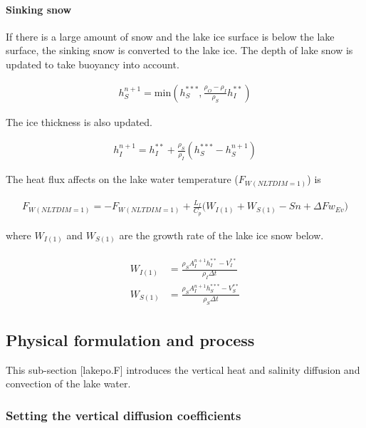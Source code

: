 \hypertarget{sinking-snow}{%
\paragraph{Sinking snow}\label{sinking-snow}}

If there is a large amount of snow and the lake ice surface is below the lake surface, the sinking snow is converted to the lake ice. The depth of lake snow is updated to take buoyancy into account.

\begin{eqnarray}
    h_S^{n+1} = \mathrm{min}(h_S^{\ast\ast\ast}, \frac{\rho_O-\rho_I}{\rho_S}h_I^{\ast\ast})
\end{eqnarray}

The ice thickness is also updated.

\begin{eqnarray}
    h_I^{n+1} = h_I^{\ast\ast} + \frac{\rho_S}{\rho_I} (h_S^{\ast\ast\ast}-h_S^{n+1})
\end{eqnarray}

The heat flux affects on the lake water temperature (\(F_{W(NLTDIM=1)}\)) is

\begin{eqnarray}
    F_{W(NLTDIM=1)} = - F_{W(NLTDIM=1)} + \frac{L_f}{C_p} \Big(W_{I(1)}+W_{S(1)}-Sn + \Delta Fw_{Ev}\Big)
\end{eqnarray}

where \(W_{I(1)}\) and \(W_{S(1)}\) are the growth rate of the lake ice snow below.

\begin{eqnarray}
\begin{array}{rl}
    W_{I(1)} &= \frac{\rho_S A_I^{n+1} h_I^{\ast\ast} - V_I^{\ast\ast}}{\rho_I \Delta t} \\
  W_{S(1)} &= \frac{\rho_S A_I^{n+1} h_S^{\ast\ast\ast} - V_S^{\ast\ast}}{\rho_S \Delta t}
\end{array}
\end{eqnarray}

\hypertarget{physical-formulation-and-process}{%
\subsection{Physical formulation and process}\label{physical-formulation-and-process}}

This sub-section {[}lakepo.F{]} introduces the vertical heat and salinity diffusion and convection of the lake water.

\hypertarget{setting-the-vertical-diffusion-coefficients}{%
\subsubsection{Setting the vertical diffusion coefficients}\label{setting-the-vertical-diffusion-coefficients}}

